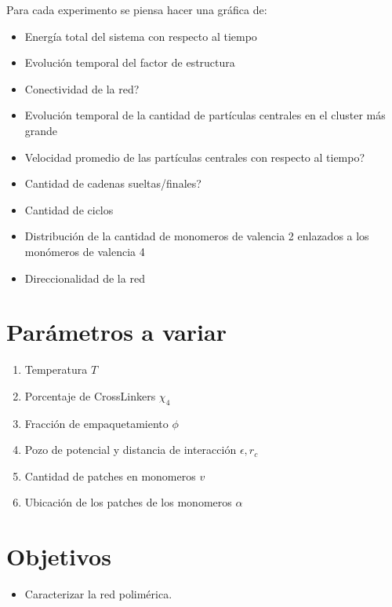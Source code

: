\documentclass[../main.tex]{subfiles}
\begin{document}
Para cada experimento se piensa hacer una gráfica de:
\begin{itemize}
    \item Energía total del sistema con respecto al tiempo
    \item Evolución temporal del factor de estructura 
    \item Conectividad de la red?
    \item Evolución temporal de la cantidad de partículas centrales en el cluster más grande
    \item Velocidad promedio de las partículas centrales con respecto al tiempo?
    \item Cantidad de cadenas sueltas/finales?
    \item Cantidad de ciclos
    \item Distribución de la cantidad de monomeros de valencia 2 enlazados a los monómeros de valencia 4
    \item Direccionalidad de la red
\end{itemize}


\section{Parámetros a variar}

\begin{enumerate}
    \item Temperatura \(T\)
    \item Porcentaje de CrossLinkers \(\chi_4\)
    \item Fracción de empaquetamiento \(\phi\)
    \item Pozo de potencial y distancia de interacción \(\epsilon, r_c\)
    \item Cantidad de patches en monomeros \(v\)
    \item Ubicación de los patches de los monomeros \(\alpha\)
\end{enumerate}


\section{Objetivos}

\begin{itemize}
    \item Caracterizar la red polimérica.
\end{itemize}
\end{document}
